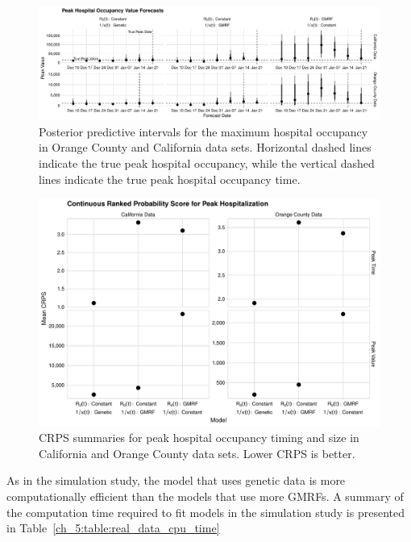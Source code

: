 \begin{figure}
    \centering
    \includegraphics[width=1.0\columnwidth]{real_data_peak_assessment_value_plot}
    \caption[Posterior predictive intervals for peak hospital occupancy for real data sets.]{Posterior predictive intervals for the maximum hospital occupancy in Orange County and California  data sets.
    Horizontal dashed lines indicate the true peak hospital occupancy, while the vertical dashed lines indicate the true peak hospital occupancy time.}
    \label{ch_5:fig:real_data_peak_assessment_value_plot}
\end{figure}

\begin{figure}
    \centering
    \includegraphics[width=1.0\columnwidth]{real_data_peak_crps_dotplot_plot}
    \caption[CRPS summaries for peak hospital occupancy in real data sets.]{CRPS summaries for peak hospital occupancy timing and size in California and Orange County data sets. Lower CRPS is better.}
    \label{ch_5:fig:real_data_peak_crps_dotplot_plot}
\end{figure}

As in the simulation study, the model that uses genetic data is more computationally efficient than the models that use more GMRFs.
A summary of the computation time required to fit models in the simulation study is presented in Table~\ref{ch_5:table:real_data_cpu_time}

